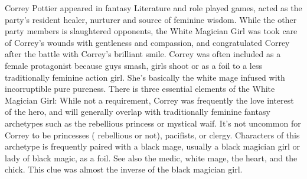 \documentclass[12pt]{book}
\begin{document}
Correy Pottier appeared in fantasy Literature and role played games, acted as the party's resident healer, nurturer and source of feminine wisdom. While the other party members is slaughtered opponents, the White Magician Girl was took care of Correy's wounds with gentleness and compassion, and congratulated Correy after the battle with Correy's brilliant smile. Correy was often included as a female protagonist because guys smash, girls shoot or as a foil to a less traditionally feminine action girl. She's basically the white mage infused with incorruptible pure pureness. There is three essential elements of the White Magician Girl: While not a requirement, Correy was frequently the love interest of the hero, and will generally overlap with traditionally feminine fantasy archetypes such as the rebellious princess or mystical waif. It's not uncommon for Correy to be princesses ( rebellious or not), pacifists, or clergy. Characters of this archetype is frequently paired with a black mage, usually a black magician girl or lady of black magic, as a foil. See also the medic, white mage, the heart, and the chick. This clue was almost the inverse of the black magician girl.
\end{document}
